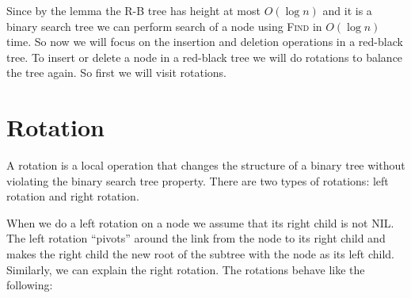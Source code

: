 Since by the lemma the R-B tree has height at most $O(\log n)$ and it is a binary search tree we can perform search of a node using \textsc{Find} in $O(\log n)$ time. So now we will focus on the insertion and deletion operations in a red-black tree.  To insert or delete a node in a red-black tree we will do  rotations to balance the tree again. So first we will visit rotations.
\section{Rotation}
A rotation is a local operation that changes the structure of a binary tree without violating the binary search tree property. There are two types of rotations: left rotation and right rotation.

When we do a left rotation on a node we assume that its right child is not NIL. The left rotation ``pivots'' around the link from the node to its right child and makes the right child the new root of the subtree with the node as its left child.  Similarly, we can explain the right rotation. The rotations behave like the following:

